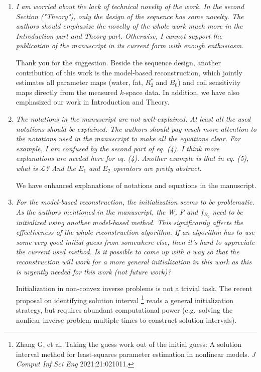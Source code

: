 \documentclass[a4paper,11pt]{report}
\begin{document}
\begin{enumerate}
	\item \textit{I am worried about the lack of technical novelty of the work. In the second Section ("Theory"), only the design of the sequence has some novelty. The authors should emphasize the novelty of the whole work much more in the Introduction part and Theory part. Otherwise, I cannot support the publication of the manuscript in its current form with enough enthusiasm.}

\hspace{1em} Thank you for the suggestion. Beside the sequence design, 
another contribution of this work is the model-based reconstruction, 
which jointly estimates all parameter maps (water, fat, $R_2^*$ and $B_0$) and 
coil sensitivity maps directly from the measured $k$-space data. 
In addition, we have also emphasized our work in Introduction and Theory.

	\item \textit{The notations in the manuscript are not well-explained. At least all the used notations should be explained. The authors should pay much more attention to the notations used in the manuscript to make all the equations clear. For example, I am confused by the second part of eq. (4). I think more explanations are needed here for eq. (4). Another example is that in eq. (5), what is $\mathcal{L}$? And the $E_1$ and $E_2$ operators are pretty abstract.}

\hspace{1em} We have enhanced explanations of notations and equations in the manuscript.

	\item \textit{For the model-based reconstruction, the initialization seems to be problematic. As the authors mentioned in the manuscript, the W, F and $f_{B_0}$ need to be initialized using another model-based method. This significantly affects the effectiveness of the whole reconstruction algorithm. If an algorithm has to use some very good initial guess from somewhere else, then it's hard to appreciate the current used method. Is it possible to come up with a way so that the reconstruction will work for a more general initialization in this work as this is urgently needed for this work (not future work)?}

\hspace{1em} Initialization in non-convex inverse problems is not a trivial task. 
The recent proposal on identifying solution interval 
\footnote{Zhang G, et al. Taking the guess work out of the initial guess: A solution interval method for least-squares parameter estimation in nonlinear models. \textit{J Comput Inf Sci Eng} 2021;21:021011.}
reads a general initialization strategy, but requires abundant computational power 
(e.g.~solving the nonliear inverse problem multiple times to construct solution intervals).


\end{enumerate}
\end{document}

